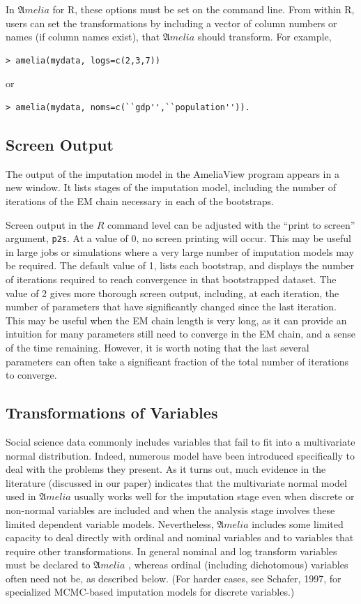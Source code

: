 \documentclass[12pt,titlepage]{article}
\newcommand{\Amelia}{\ensuremath{\mathfrak Amelia} }
\begin{document}
In \Amelia for R, these options must be set on the command line.  From
within R, users can set the transformations by including a vector of
column numbers or names (if column names exist), that \Amelia should
transform.  For example,

  \begin{verbatim}> amelia(mydata, logs=c(2,3,7))\end{verbatim} or
  \begin{verbatim}> amelia(mydata, noms=c(``gdp'',``population'')).\end{verbatim}

\subsection{Screen Output}
The output of the imputation model in the AmeliaView program appears in a new window.  It lists stages of the imputation model, including the number of iterations of the EM chain necessary in each of the bootstraps.

Screen output in the $R$ command level can be adjusted with the ``print to screen'' argument, \texttt{p2s}.  At a value of 0, no screen printing will occur.  This may be useful in large jobs or simulations where a very large number of imputation models may be required.  The default value of 1, lists each bootstrap, and displays the number of iterations required to reach convergence in that bootstrapped dataset.  The value of 2 gives more thorough screen output, including, at each iteration, the number of parameters that have significantly changed since the last iteration.  This may be useful when the EM chain length is very long, as it can provide an intuition for many parameters still need to converge in the EM chain, and a sense of the time remaining.  However, it is worth noting that the last several parameters can often take a significant fraction of the total number of iterations to converge.

\subsection{Transformations of Variables}
\label{sec:trans}

Social science data commonly includes variables that fail to fit into
a multivariate normal distribution. Indeed, numerous model have been
introduced specifically to deal with the problems they present.  As it
turns out, much evidence in the literature (discussed in our paper)
indicates that the multivariate normal model used in ${\mathfrak
  Amelia}$ usually works well for the imputation stage even when
discrete or non-normal variables are included and when the analysis
stage involves these limited dependent variable models.  Nevertheless,
${\mathfrak Amelia}$ includes some limited capacity to deal directly
with ordinal and nominal variables and to variables that require other
transformations.  In general nominal and log transform variables must
be declared to \Amelia, whereas ordinal (including dichotomous)
variables often need not be, as described below.  (For harder cases,
see Schafer, 1997, for specialized MCMC-based imputation models for
discrete variables.)\nocite{KinHonJos01}
\end{document}
